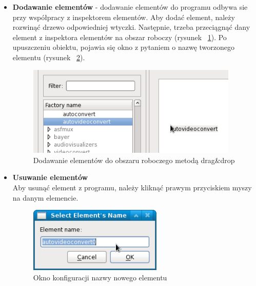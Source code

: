 \documentclass[12pt]{article}
\begin{document}
\begin{itemize}
  \setlength{\itemsep}{0em}

\item 
\textbf{Dodawanie elementów} - dodawanie elementów do programu odbywa sie przy współpracy z inspektorem elementów. Aby dodać element, należy rozwinąć drzewo odpowiedniej wtyczki. Następnie, trzeba przeciągnąć dany element z inspektora elementów na obszar roboczy (rysunek ~\ref{fig:dragDropElement}). Po upuszczeniu obiektu, pojawia się okno z pytaniem o nazwę tworzonego elementu (rysunek ~\ref{fig:nameForElementWindow}).
\begin{figure}[H]
  \includegraphics[width=0.95\textwidth]{img/drag-drop-element.png}
  \caption{Dodawanie elementów do obszaru roboczego metodą drag\&drop}
  \label{fig:dragDropElement}
\end{figure}
\item \textbf{Usuwanie elementów}\\ 
Aby usunąć element z programu, należy kliknąć prawym przyciskiem myszy na danym elemencie.
\begin{figure}[H]
  \includegraphics[width=0.6\textwidth]{img/name-for-element-window.png}
  \caption{Okno konfiguracji nazwy nowego elementu}
  \label{fig:nameForElementWindow}
\end{figure}


\end{itemize}
\end{document}
